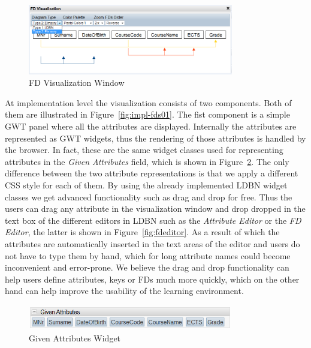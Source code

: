 \begin{figure}[h]
	\begin{center}
		\includegraphics[width=0.8\textwidth]{./img/fd-visual-win.png}
		\caption{FD Visualization Window}
		\label{fig:fd-visual-win}
	\end{center}
\end{figure}

At implementation level the visualization consists of two components. 
Both of them are illustrated in Figure~\ref{fig:impl-fds01}.
The fist component is a simple GWT panel where all the attributes are displayed. Internally 
the attributes are represented as GWT widgets, thus the rendering of those attributes is
handled by the browser. In fact, these are the same widget classes used for representing
attributes in the \emph{Given Attributes} field, which is shown in Figure~\ref{fig:given-atts}. The only 
difference between the two attribute representations is 
that we apply a different CSS style for each of them. By using the already implemented LDBN 
widget classes we get advanced functionality such as drag and drop for free. Thus the users
can drag any attribute in the visualization window and drop 
dropped in the text box of the different editors in LDBN
such as the \emph{Attribute Editor} or the \emph{FD Editor}, the latter is 
shown in Figure~\ref{fig:fdeditor}. 
As a result of which the
attributes are automatically inserted in the text areas of the editor and users do not have
to type them by hand, which for long attribute names could become inconvenient and error-prone. 
We believe the drag and drop functionality can help
users define attributes, keys or FDs much more quickly, which on the other hand can
help improve the usability of the learning environment.

\begin{figure}[h]
	\begin{center}
		\includegraphics[width=0.8\textwidth]{./img/given-atts.png}
		\caption{Given Attributes Widget}
		\label{fig:given-atts}
	\end{center}
\end{figure}

